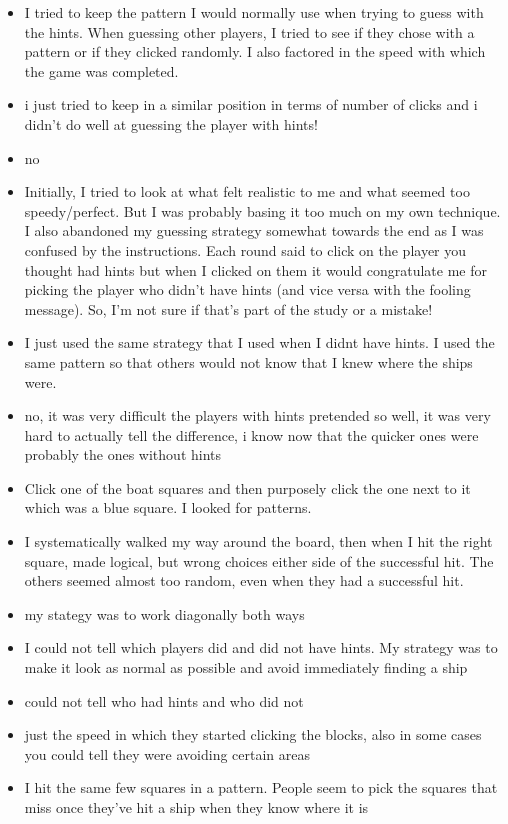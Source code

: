 \documentclass[
  english,
  man]{apa6}
\begin{document}
\begin{itemize}
\item
  I tried to keep the pattern I would normally use when trying to guess with the hints. When guessing other players, I tried to see if they chose with a pattern or if they clicked randomly. I also factored in the speed with which the game was completed.
\item
  i just tried to keep in a similar position in terms of number of clicks and i didn't do well at guessing the player with hints!
\item
  no
\item
  Initially, I tried to look at what felt realistic to me and what seemed too speedy/perfect. But I was probably basing it too much on my own technique. I also abandoned my guessing strategy somewhat towards the end as I was confused by the instructions. Each round said to click on the player you thought had hints but when I clicked on them it would congratulate me for picking the player who didn't have hints (and vice versa with the fooling message). So, I'm not sure if that's part of the study or a mistake!
\item
  I just used the same strategy that I used when I didnt have hints. I used the same pattern so that others would not know that I knew where the ships were.
\item
  no, it was very difficult the players with hints pretended so well, it was very hard to actually tell the difference, i know now that the quicker ones were probably the ones without hints
\item
  Click one of the boat squares and then purposely click the one next to it which was a blue square. I looked for patterns.
\item
  I systematically walked my way around the board, then when I hit the right square, made logical, but wrong choices either side of the successful hit. The others seemed almost too random, even when they had a successful hit.
\item
  my stategy was to work diagonally both ways
\item
  I could not tell which players did and did not have hints. My strategy was to make it look as normal as possible and avoid immediately finding a ship
\item
  could not tell who had hints and who did not
\item
  just the speed in which they started clicking the blocks, also in some cases you could tell they were avoiding certain areas
\item
  I hit the same few squares in a pattern. People seem to pick the squares that miss once they've hit a ship when they know where it is

\end{itemize}
\end{document}

